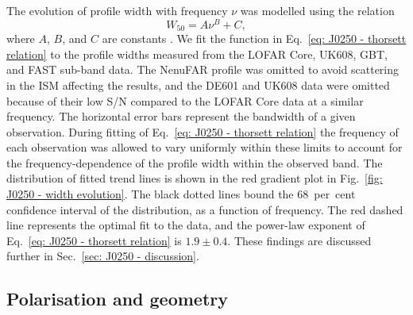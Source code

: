 The evolution of profile width with frequency $\nu$ was modelled using the relation
\begin{equation}
\label{eq: J0250 - thorsett relation}
    W_{50} = A\nu^B + C,
\end{equation}
where $A$, $B$, and $C$ are constants \citep{Txxx1991, CWxx2014}. We fit the function in Eq.~\eqref{eq: J0250 - thorsett relation} to the profile widths measured from the LOFAR Core, UK608, GBT, and FAST sub-band data. The NenuFAR profile was omitted to avoid scattering in the ISM affecting the results, and the DE601 and UK608 data were omitted because of their low S/N compared to the LOFAR Core data at a similar frequency. The horizontal error bars represent the bandwidth of a given observation. During fitting of Eq.~\eqref{eq: J0250 - thorsett relation} the frequency of each observation was allowed to vary uniformly within these limits to account for the frequency-dependence of the profile width within the observed band. The distribution of fitted trend lines is shown in the red gradient plot in Fig.~\ref{fig: J0250 - width evolution}. The black dotted lines bound the 68~per~cent confidence interval of the distribution, as a function of frequency. The red dashed line represents the optimal fit to the data, and the power-law exponent of Eq.~\eqref{eq: J0250 - thorsett relation} is $1.9 \pm 0.4$. These findings are discussed further in Sec.~\ref{sec: J0250 - discussion}.







\subsection{Polarisation and geometry}
\label{sec: J0250 - analysis - polarisation and geometry}

